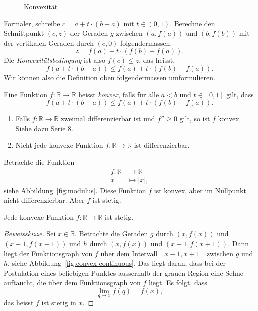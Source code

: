 \documentclass[../main.tex]{subfiles}
\begin{document}
\begin{figure}[htb]
  \centering
  
  \caption{Konvexität}%
  \label{fig:convexity}
\end{figure}

Formaler, schreibe
$
  c = a + t \cdot (b-a)
  $
mit $t \in (0, 1)$.
Berechne den Schnittpunkt $(c, z)$ der
Geraden $g$ zwischen
$(a, f(a))$ und $(b, f(b))$ 
mit der vertikalen Geraden durch $(c, 0)$ 
folgendermassen:
\[
  z = f(a) + t \cdot (f(b) - f(a)).
\]
Die \emph{Konvexitätsbedingung} ist also
$f(c) \leq z$, das heisst,
\[
  f(a + t \cdot (b-a)) \leq f(a) + t\cdot (f(b) - f(a)).
\]
Wir können also die Definition oben folgendermassen
umformulieren.

\begin{definition}
  Eine Funktion $f \colon \mathbb{R} \to \mathbb{R}$ 
  heisst \emph{konvex}, falls für alle $a < b$ 
  und $t \in [0, 1]$ gilt, dass
  \[
    f(a + t \cdot (b - a)) \leq f(a) + t\cdot (f(b) - f(a)).
  \]
\end{definition}

\newpage
\begin{remarks}
  \leavevmode
  \begin{enumerate}[(1)]
    \item Falls $f \colon \mathbb{R} \to \mathbb{R}$ 
      zweimal differenzierbar ist und $f'' \geq 0$ gilt,
      so ist $f$ konvex. Siehe dazu Serie 8.
    \item Nicht jede konvexe Funktion
      $f \colon \mathbb{R} \to \mathbb{R}$ ist
      differenzierbar.
  \end{enumerate}
\end{remarks}

\begin{example}
  Betrachte die Funktion
  \begin{align*}
    f \colon \mathbb{R} & \to \mathbb{R} \\
    x & \mapsto |x|,
  \end{align*}
  siehe Abbildung~\ref{fig:modulus}.
  Diese Funktion $f$ ist konvex, aber im
  Nullpunkt nicht differenzierbar.
  Aber $f$ ist stetig.
\end{example}

\begin{claim}
  Jede konvexe Funktion $f \colon \mathbb{R} \to \mathbb{R}$ 
  ist stetig.
\end{claim}

\begin{proof}[Beweisskizze]
  Sei $x \in \mathbb{R}$.
  Betrachte die Geraden $g$ 
  durch $(x, f(x))$ und $(x-1, f(x-1))$
  und $h$ durch $(x, f(x))$ und $(x+  1, f(x+1))$.
  Dann liegt der Funktionsgraph von $f$ 
  über dem Intervall $[x-1, x+1]$ zwischen
  $g$ und $h$, siehe Abbildung~\ref{fig:convex-continuous}.
  Das liegt daran, dass bei der Postulation
  eines beliebigen Punktes ausserhalb
  der grauen Region eine Sehne auftaucht,
  die über dem Funktionsgraph von $f$ liegt.
  Es folgt, dass
  \[
    \lim_{q \to x} f(q) = f(x),
  \]
  das heisst $f$ ist stetig in $x$.
\end{proof}
\end{document}

